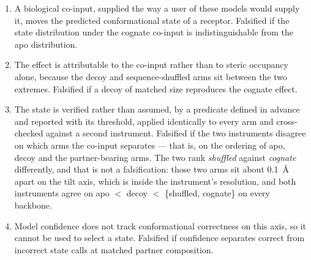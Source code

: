 \begin{enumerate}
  \item A biological co-input, supplied the way a user of these models would supply it, moves the predicted conformational state of a receptor. Falsified if the state distribution under the cognate co-input is indistinguishable from the apo distribution.
  \item The effect is attributable to the co-input rather than to steric occupancy alone, because the decoy and sequence-shuffled arms sit between the two extremes. Falsified if a decoy of matched size reproduces the cognate effect.
  \item The state is verified rather than assumed, by a predicate defined in advance and reported with its threshold, applied identically to every arm and cross-checked against a second instrument. Falsified if the two instruments disagree on which arms the co-input separates --- that is, on the ordering of apo, decoy and the partner-bearing arms. The two rank \emph{shuffled} against \emph{cognate} differently, and that is not a falsification: those two arms sit about 0.1~\AA{} apart on the tilt axis, which is inside the instrument's resolution, and both instruments agree on apo $<$ decoy $<$ \{shuffled, cognate\} on every backbone.
  \item Model confidence does not track conformational correctness on this axis, so it cannot be used to select a state. Falsified if confidence separates correct from incorrect state calls at matched partner composition.
\end{enumerate}